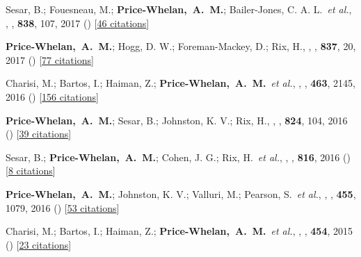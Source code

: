 \item[{\color{deemph}\scriptsize25}]Sesar, B.; Fouesneau, M.; \textbf{Price-Whelan,~A.~M.}; Bailer-Jones, C. A. L.~\textit{et al.}, , \apj, \textbf{838}, 107, 2017 () [\href{http://adsabs.harvard.edu/abs/2017ApJ...838..107S}{46 citations}]

\item[{\color{deemph}\scriptsize24}]\textbf{Price-Whelan,~A.~M.}; Hogg, D. W.; Foreman-Mackey, D.; Rix, H., , \apj, \textbf{837}, 20, 2017 () [\href{http://adsabs.harvard.edu/abs/2017ApJ...837...20P}{77 citations}]

\item[{\color{deemph}\scriptsize23}]Charisi, M.; Bartos, I.; Haiman, Z.; \textbf{Price-Whelan,~A.~M.}~\textit{et al.}, , \mnras, \textbf{463}, 2145, 2016 () [\href{http://adsabs.harvard.edu/abs/2016MNRAS.463.2145C}{156 citations}]

\item[{\color{deemph}\scriptsize22}]\textbf{Price-Whelan,~A.~M.}; Sesar, B.; Johnston, K. V.; Rix, H., , \apj, \textbf{824}, 104, 2016 () [\href{http://adsabs.harvard.edu/abs/2016ApJ...824..104P}{39 citations}]

\item[{\color{deemph}\scriptsize21}]Sesar, B.; \textbf{Price-Whelan,~A.~M.}; Cohen, J. G.; Rix, H.~\textit{et al.}, , \apj, \textbf{816}, 2016 () [\href{http://adsabs.harvard.edu/abs/2016ApJ...816L...4S}{8 citations}]

\item[{\color{deemph}\scriptsize20}]\textbf{Price-Whelan,~A.~M.}; Johnston, K. V.; Valluri, M.; Pearson, S.~\textit{et al.}, , \mnras, \textbf{455}, 1079, 2016 () [\href{http://adsabs.harvard.edu/abs/2016MNRAS.455.1079P}{53 citations}]

\item[{\color{deemph}\scriptsize19}]Charisi, M.; Bartos, I.; Haiman, Z.; \textbf{Price-Whelan,~A.~M.}~\textit{et al.}, , \mnras, \textbf{454}, 2015 () [\href{http://adsabs.harvard.edu/abs/2015MNRAS.454L..21C}{23 citations}]

